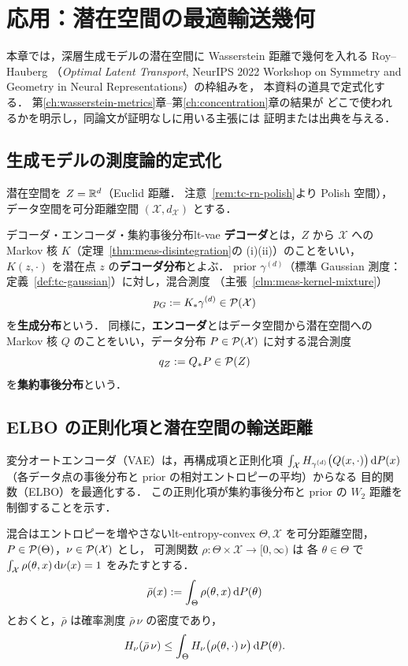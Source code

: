 \chapter{応用：潜在空間の最適輸送幾何}
\label{ch:latent}

本章では，深層生成モデルの潜在空間に Wasserstein 距離で幾何を入れる
Roy--Hauberg
（\emph{Optimal Latent Transport}, NeurIPS 2022 Workshop on
Symmetry and Geometry in Neural Representations）の枠組みを，
本資料の道具で定式化する．
第\ref{ch:wasserstein-metrics}章--第\ref{ch:concentration}章の結果が
どこで使われるかを明示し，同論文が証明なしに用いる主張には
証明または出典を与える．

\section{生成モデルの測度論的定式化}
\label{sec:lt-setup}

潜在空間を $Z=\mathbb{R}^d$（Euclid 距離．
注意~\ref{rem:tc-rn-polish}より Polish 空間），
データ空間を可分距離空間 $(\mathcal{X},d_{\mathcal{X}})$ とする．

\begin{definition}{デコーダ・エンコーダ・集約事後分布}{lt-vae}
  \textbf{デコーダ}とは，$Z$ から $\mathcal{X}$ への Markov 核
  $K$（定理~\ref{thm:meas-disintegration}の (i)(ii)）のことをいい，
  $K(z,\cdot)$ を潜在点 $z$ の\textbf{デコーダ分布}とよぶ．
  prior $\gamma^{(d)}$（標準 Gaussian 測度：
  定義~\ref{def:tc-gaussian}）に対し，混合測度
  （主張~\ref{clm:meas-kernel-mixture}）
  \[
    p_G:=K_*\gamma^{(d)}\in\mathcal{P}(\mathcal{X})
  \]
  を\textbf{生成分布}という．
  同様に，\textbf{エンコーダ}とはデータ空間から潜在空間への
  Markov 核 $Q$ のことをいい，データ分布
  $P\in\mathcal{P}(\mathcal{X})$ に対する混合測度
  \[
    q_Z:=Q_*P\in\mathcal{P}(Z)
  \]
  を\textbf{集約事後分布}という．
\end{definition}

\section{ELBO の正則化項と潜在空間の輸送距離}
\label{sec:lt-elbo}

変分オートエンコーダ（VAE）は，再構成項と正則化項
$\int_{\mathcal{X}}H_{\gamma^{(d)}}\bigl(Q(x,\cdot)\bigr)\,\mathrm{d} P(x)$
（各データ点の事後分布と prior の相対エントロピーの平均）からなる
目的関数（ELBO）を最適化する．
この正則化項が集約事後分布と prior の $W_2$ 距離を制御することを示す．

\begin{lemma}{混合はエントロピーを増やさない}{lt-entropy-convex}
  $\Theta,\mathcal{X}$ を可分距離空間，
  $P\in\mathcal{P}(\Theta)$，$\nu\in\mathcal{P}(\mathcal{X})$ とし，
  可測関数 $\rho\colon\Theta\times\mathcal{X}\to[0,\infty)$ は
  各 $\theta\in\Theta$ で
  $\int_{\mathcal{X}}\rho(\theta,x)\,\mathrm{d}\nu(x)=1$ をみたすとする．
  \[
    \bar\rho(x):=\int_\Theta\rho(\theta,x)\,\mathrm{d} P(\theta)
  \]
  とおくと，$\bar\rho$ は確率測度 $\bar\rho\,\nu$ の密度であり，
  \[
    H_\nu(\bar\rho\,\nu)
    \leq\int_\Theta H_\nu\bigl(\rho(\theta,\cdot)\,\nu\bigr)\,\mathrm{d} P(\theta).
  \]
\end{lemma}

